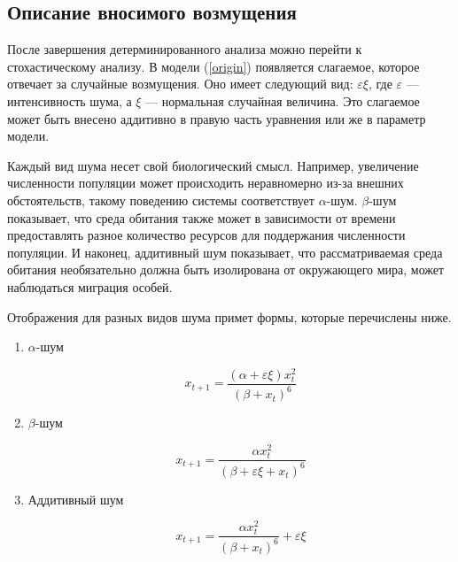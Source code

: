 \subsection{Описание вносимого возмущения}

    После завершения детерминированного анализа можно перейти к стохастическому анализу. В модели (\ref{origin}) появляется слагаемое, которое отвечает за случайные возмущения. Оно имеет следующий вид: \(\varepsilon \xi\), где \(\varepsilon\) --- интенсивность шума, а \(\xi\) --- нормальная случайная величина. Это слагаемое может быть внесено аддитивно в правую часть уравнения или же в параметр модели. 
        
    Каждый вид шума несет свой биологический смысл. Например, увеличение численности популяции может происходить неравномерно из-за внешних обстоятельств, такому поведению системы соответствует \(\alpha\)-шум. \(\beta\)-шум показывает, что среда обитания также может в зависимости от времени предоставлять разное количество ресурсов для поддержания численности популяции. И наконец, аддитивный шум показывает, что рассматриваемая среда обитания необязательно должна быть изолирована от окружающего мира, может наблюдаться миграция особей.
        
    Отображения для разных видов шума примет формы, которые перечислены ниже.

    \begin{enumerate}
        \item \(\alpha\)-шум

            \begin{equation}
                \label{alpha_chaos}
                x_{t + 1} = \frac{(\alpha + \varepsilon \xi) x_t^2}{(\beta + x_t)^6}
            \end{equation}
    
        \item \(\beta\)-шум
    
            \begin{equation}
                \label{beta_chaos}
                x_{t + 1} = \frac{\alpha x_t^2}{(\beta + \varepsilon \xi + x_t)^6}
            \end{equation}
    
        \item Аддитивный шум
    
            \begin{equation}
                \label{additive_chaos}
                x_{t + 1} = \frac{\alpha x_t^2}{(\beta + x_t)^6} + \varepsilon \xi
            \end{equation}
    \end{enumerate}